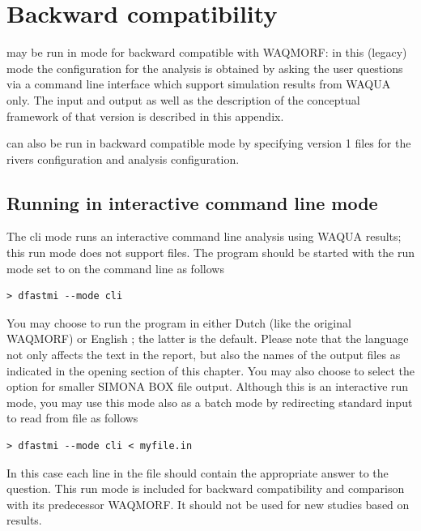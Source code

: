 \chapter{Backward compatibility} \label{Chp:backward}

\dfastmi may be run in  mode for backward compatible with WAQMORF: in this (legacy) mode the configuration for the analysis is obtained by asking the user questions via a command line interface which support simulation results from WAQUA only.
The input and output as well as the description of the conceptual framework of that version is described in this appendix.

\dfastmi can also be run in backward compatible  mode by specifying version 1 files for the rivers configuration and analysis configuration.

\section{Running in interactive command line mode}

The cli mode runs an interactive command line analysis using WAQUA results; this run mode does not support \dflowfm files.
The program should be started with the run mode set to  on the command line as follows

\begin{Verbatim}
> dfastmi --mode cli
\end{Verbatim}

You may choose to run the program in either Dutch  (like the original WAQMORF) or English ; the latter is the default.
Please note that the language not only affects the text in the report, but also the names of the output files as indicated in the opening section of this chapter.
You may also choose to select the  option for smaller SIMONA BOX file output.
Although this is an interactive run mode, you may use this mode also as a batch mode by redirecting standard input to read from file as follows

\begin{Verbatim}
> dfastmi --mode cli < myfile.in
\end{Verbatim}

In this case each line in the file  should contain the appropriate answer to the question.
This run mode is included for backward compatibility and comparison with its predecessor WAQMORF.
It should not be used for new studies based on \dflowfm results.

